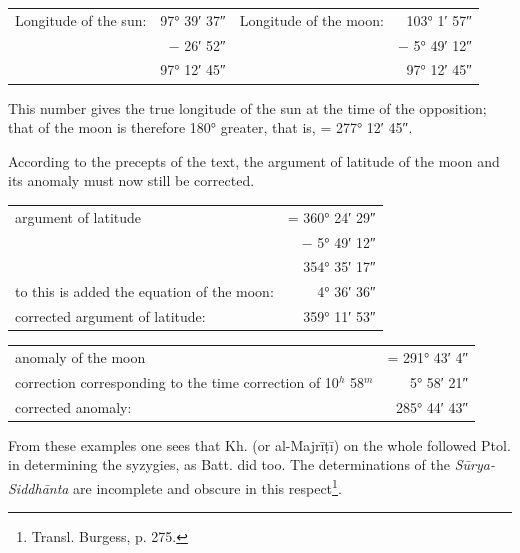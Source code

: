 \documentclass[11pt]{article}
\newcommand{\Pg}[1]{\marginpar{\footnotesize\color{gray}#1}}
\begin{document}
\begin{center}\small\begin{tabular}{lrlr}
Longitude of the sun: & 97° 39′ 37″ & Longitude of the moon: & 103° 1′ 57″ \\
 & − 26′ 52″ &  & − 5° 49′ 12″ \\
 & 97° 12′ 45″ &  & 97° 12′ 45″ \\
\end{tabular}\end{center}
\par This number gives the true longitude of the sun at the time of the opposition; that of the moon is therefore 180° greater, that is, = 277° 12′ 45″.\par
\par According to the precepts of the text, the argument of latitude of the moon and its anomaly must now still be corrected.\par
\begin{center}\small\begin{tabular}{lr}
argument of latitude & = 360° 24′ 29″ \\
 & − 5° 49′ 12″ \\
 & 354° 35′ 17″ \\
to this is added the equation of the moon: & 4° 36′ 36″ \\
corrected argument of latitude: & 359° 11′ 53″ \\
\end{tabular}\end{center}
\begin{center}\small\begin{tabular}{lr}
anomaly of the moon & = 291° 43′ 4″ \\
correction corresponding to the time correction of 10$^{h}$ 58$^{m}$\footnotemark{} & 5° 58′ 21″ \\
corrected anomaly\footnotemark{}: & 285° 44′ 43″ \\
\end{tabular}\end{center}
\addtocounter{footnote}{-2}
\par \Pg{86}From these examples one sees that Kh. (or al-Majrīṭī) on the whole followed Ptol. in determining the syzygies, as Batt. did too. The determinations of the \emph{Sūrya-Siddhānta} are incomplete and obscure in this respect\footnote{Transl. Burgess, p. 275.}.\par
\end{document}

